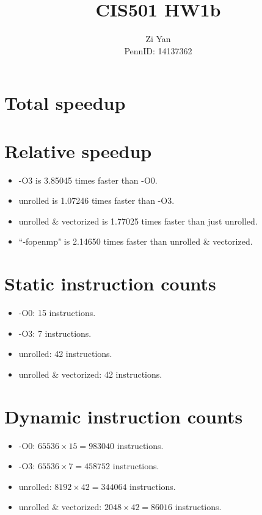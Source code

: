 \documentclass[12pt,letterpaper]{article}
\author{Zi Yan\\PennID: 14137362}
\title{CIS501 HW1b}
\date{}
\begin{document}
\maketitle

\section{Total speedup}
\clearpage
\section{Relative speedup}
\begin{itemize}
    \item -O3 is 3.85045 times faster than -O0.
    \item unrolled is 1.07246 times faster than -O3.
    \item unrolled \& vectorized is 1.77025 times faster than just unrolled.
    \item ``-fopenmp" is 2.14650 times faster than unrolled \& vectorized.
\end{itemize}
\section{Static instruction counts}
\begin{itemize}
    \item -O0: 15 instructions.
    \item -O3: 7 instructions.
    \item unrolled: 42 instructions.
    \item unrolled \& vectorized: 42 instructions.
\end{itemize}

\section{Dynamic instruction counts}
\begin{itemize}
    \item -O0: $65536 \times 15 = 983040$ instructions.
    \item -O3: $65536 \times 7 = 458752$ instructions.
    \item unrolled: $8192 \times 42 = 344064$ instructions.
    \item unrolled \& vectorized: $2048 \times 42 = 86016$ instructions.
\end{itemize}
\end{document}
